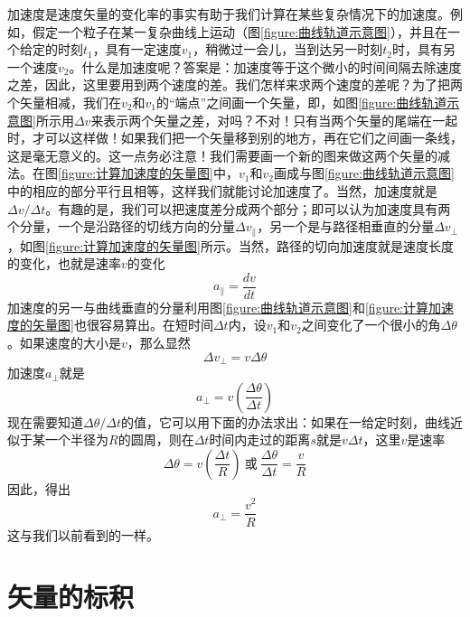 加速度是速度矢量的变化率的事实有助于我们计算在某些复杂情况下的加速度。例如，假定一个粒子在某一复杂曲线上运动（图\ref{figure:曲线轨道示意图}），并且在一个给定的时刻$t_1$，具有一定速度$v_1$，稍微过一会儿，当到达另一时刻$t_2$时，具有另一个速度$v_2$。什么是加速度呢？答案是：加速度等于这个微小的时间间隔去除速度之差，因此，这里要用到两个速度的差。我们怎样来求两个速度的差呢？为了把两个矢量相减，我们在$v_2$和$v_1$的“端点”之间画一个矢量，即，如图\ref{figure:曲线轨道示意图}所示用$\Delta v$来表示两个矢量之差，对吗？不对！只有当两个矢量的尾端在一起时，才可以这样做！如果我们把一个矢量移到别的地方，再在它们之间画一条线，这是毫无意义的。这一点务必注意！我们需要画一个新的图来做这两个矢量的减法。在图\ref{figure:计算加速度的矢量图}中，$v_1$和$v_2$画成与图\ref{figure:曲线轨道示意图}中的相应的部分平行且相等，这样我们就能讨论加速度了。当然，加速度就是$\Delta v/\Delta t$。有趣的是，我们可以把速度差分成两个部分；即可以认为加速度具有两个分量，一个是沿路径的切线方向的分量$\Delta v_{\parallel}$，另一个是与路径相垂直的分量$\Delta v_{\bot}$，如图\ref{figure:计算加速度的矢量图}所示。当然，路径的切向加速度就是速度长度的变化，也就是速率$v$的变化
\begin{equation}
    \label{Eq:I:11:15}
    a_{\parallel}=\frac{dv}{dt}
\end{equation}
加速度的另一与曲线垂直的分量利用图\ref{figure:曲线轨道示意图}和\ref{figure:计算加速度的矢量图}也很容易算出。在短时间$\Delta t$内，设$v_1$和$v_2$之间变化了一个很小的角$\Delta \theta$。如果速度的大小是$v$，那么显然
\begin{equation*}
    \Delta v_{\bot}=v \Delta \theta
\end{equation*}
加速度$a_{\bot}$就是
\begin{equation*}
    a_{\bot}=v(\frac{\Delta \theta}{\Delta t})
\end{equation*}
现在需要知道$\Delta \theta/\Delta t$的值，它可以用下面的办法求出：如果在一给定时刻，曲线近似于某一个半径为$R$的圆周，则在$\Delta t$时间内走过的距离$s$就是$v \Delta t$，这里$v$是速率
\begin{equation*}
    \Delta \theta =v(\frac{\Delta t}{R})~\text{或}~\frac{\Delta \theta}{\Delta t}=\frac{v}{R}
\end{equation*}
因此，得出
\begin{equation}
    \label{Eq:I:11:16}
    a_{\bot}=\frac{v^2}{R}
\end{equation}
这与我们以前看到的一样。

\section{矢量的标积}

